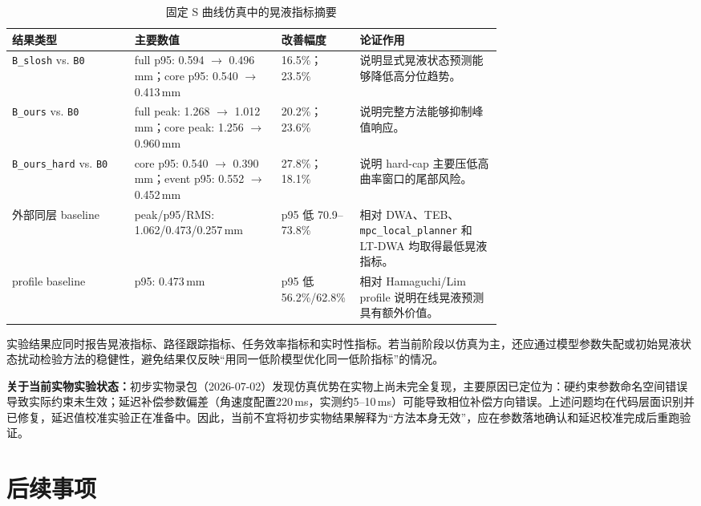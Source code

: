 \documentclass[12pt,a4paper]{ctexart}
\newcommand{\DWA}{DWA}
\newcommand{\TEB}{TEB}
\begin{document}
\begin{table}[htbp]
  \centering
  \small
  \caption{固定 S 曲线仿真中的晃液指标摘要}
  \begin{tabularx}{\linewidth}{p{0.25\linewidth}p{0.30\linewidth}p{0.16\linewidth}Y}
    \toprule
    结果类型 & 主要数值 & 改善幅度 & 论证作用 \\
    \midrule
    \texttt{B\_slosh} vs. \texttt{B0} & full p95: 0.594 $\rightarrow$ 0.496\,mm；core p95: 0.540 $\rightarrow$ 0.413\,mm & 16.5\%；23.5\% & 说明显式晃液状态预测能够降低高分位趋势。 \\
    \texttt{B\_ours} vs. \texttt{B0} & full peak: 1.268 $\rightarrow$ 1.012\,mm；core peak: 1.256 $\rightarrow$ 0.960\,mm & 20.2\%；23.6\% & 说明完整方法能够抑制峰值响应。 \\
    \texttt{B\_ours\_hard} vs. \texttt{B0} & core p95: 0.540 $\rightarrow$ 0.390\,mm；event p95: 0.552 $\rightarrow$ 0.452\,mm & 27.8\%；18.1\% & 说明 hard-cap 主要压低高曲率窗口的尾部风险。 \\
    外部同层 baseline & peak/p95/RMS: 1.062/0.473/0.257\,mm & p95 低 70.9--73.8\% & 相对 \DWA{}、\TEB{}、\texttt{mpc\_local\_planner} 和 LT-DWA 均取得最低晃液指标。 \\
    profile baseline & p95: 0.473\,mm & p95 低 56.2\%/62.8\% & 相对 Hamaguchi/Lim profile 说明在线晃液预测具有额外价值。 \\
    \bottomrule
  \end{tabularx}
\end{table}

实验结果应同时报告晃液指标、路径跟踪指标、任务效率指标和实时性指标。若当前阶段以仿真为主，还应通过模型参数失配或初始晃液状态扰动检验方法的稳健性，避免结果仅反映“用同一低阶模型优化同一低阶指标”的情况。

\textbf{关于当前实物实验状态：}初步实物录包（2026-07-02）发现仿真优势在实物上尚未完全复现，主要原因已定位为：硬约束参数命名空间错误导致实际约束未生效；延迟补偿参数偏差（角速度配置220\,ms，实测约5--10\,ms）可能导致相位补偿方向错误。上述问题均在代码层面识别并已修复，延迟值校准实验正在准备中。因此，当前不宜将初步实物结果解释为“方法本身无效”，应在参数落地确认和延迟校准完成后重跑验证。

\section{后续事项}
\label{sec:todo}
\end{document}
